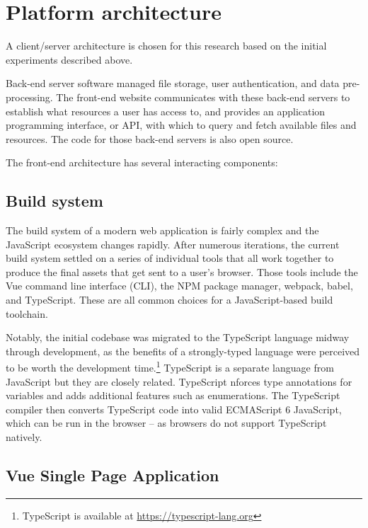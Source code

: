 \hypertarget{mathub-platform-architecture}{%
\section{Platform architecture}\label{platform-architecture}}

A client/server architecture is chosen for this research based on the initial experiments described above.

Back-end server software managed file storage, user authentication, and data pre-processing. The front-end website communicates with these back-end servers to establish what resources a user has access to, and provides an application programming interface, or API, with which to query and fetch available files and resources. The code for those back-end servers is also open source.

The front-end architecture has several interacting components:

\hypertarget{mathub-build-system}{%
\subsection{Build system}\label{build-system}}

The build system of a modern web application is fairly complex and the JavaScript ecosystem changes rapidly. After numerous iterations, the current build system settled on a series of individual tools that all work together to produce the final assets that get sent to a user's browser. Those tools include the Vue command line interface (CLI), the NPM package manager, webpack, babel, and TypeScript. These are all common choices for a JavaScript-based build toolchain.

Notably, the initial codebase was migrated to the TypeScript language midway through development, as the benefits of a strongly-typed language were perceived to be worth the development time.\footnote{TypeScript is available at \url{https://typescript-lang.org}} TypeScript is a separate language from JavaScript but they are closely related. TypeScript nforces type annotations for variables and adds additional features such as enumerations. The TypeScript compiler then converts TypeScript code into valid ECMAScript 6 JavaScript, which can be run in the browser -- as browsers do not support TypeScript natively.

\hypertarget{vue-single-page-application}{%
\subsection{Vue Single Page Application}\label{vue-single-page-application}}

